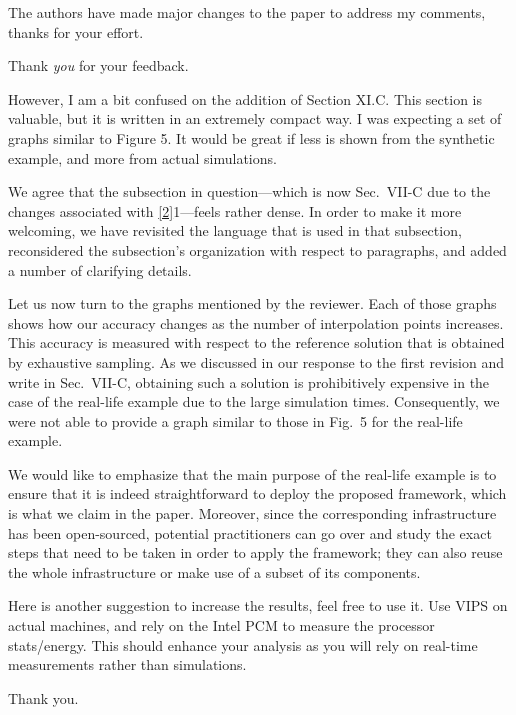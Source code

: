 \begin{reviewer}
The authors have made major changes to the paper to address my comments, thanks
for your effort.
\end{reviewer}

\begin{authors}
Thank \emph{you} for your feedback.
\end{authors}

\begin{reviewer}
However, I am a bit confused on the addition of Section XI.C. This section is
valuable, but it is written in an extremely compact way. I was expecting a set
of graphs similar to Figure 5. It would be great if less is shown from the
synthetic example, and more from actual simulations.
\end{reviewer}

\begin{authors}
We agree that the subsection in question---which is now Sec.~VII-C due to the
changes associated with \cref{2}{1}---feels rather dense. In order to make it
more welcoming, we have revisited the language that is used in that subsection,
reconsidered the subsection's organization with respect to paragraphs, and added
a number of clarifying details.

Let us now turn to the graphs mentioned by the reviewer. Each of those graphs
shows how our accuracy changes as the number of interpolation points increases.
This accuracy is measured with respect to the reference solution that is
obtained by exhaustive sampling. As we discussed in our response to the first
revision and write in Sec.~VII-C, obtaining such a solution is prohibitively
expensive in the case of the real-life example due to the large simulation
times. Consequently, we were not able to provide a graph similar to those in
Fig.~5 for the real-life example.

We would like to emphasize that the main purpose of the real-life example is to
ensure that it is indeed straightforward to deploy the proposed framework, which
is what we claim in the paper. Moreover, since the corresponding infrastructure
has been open-sourced, potential practitioners can go over and study the exact
steps that need to be taken in order to apply the framework; they can also reuse
the whole infrastructure or make use of a subset of its components.

\begin{actions}
\end{actions}
\end{authors}

\begin{reviewer}
Here is another suggestion to increase the results, feel free to use it. Use
VIPS on actual machines, and rely on the Intel PCM to measure the processor
stats/energy. This should enhance your analysis as you will rely on real-time
measurements rather than simulations.
\end{reviewer}

\begin{authors}
Thank you.
\end{authors}
